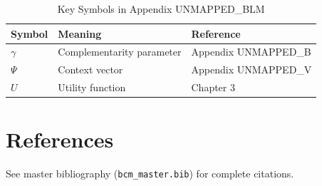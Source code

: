 \begin{table}[htbp]
\centering
\caption{Key Symbols in Appendix UNMAPPED_BLM}
\begin{tabular}{lll}
\toprule
\textbf{Symbol} & \textbf{Meaning} & \textbf{Reference} \\
\midrule
$\gamma$ & Complementarity parameter & Appendix UNMAPPED_B \\
$\Psi$ & Context vector & Appendix UNMAPPED_V \\
$U$ & Utility function & Chapter 3 \\
\bottomrule
\end{tabular}
\end{table}


\section{References}
\label{sec:blm-references}

See master bibliography (\texttt{bcm\_master.bib}) for complete citations.

\nocite{bcm_master}

